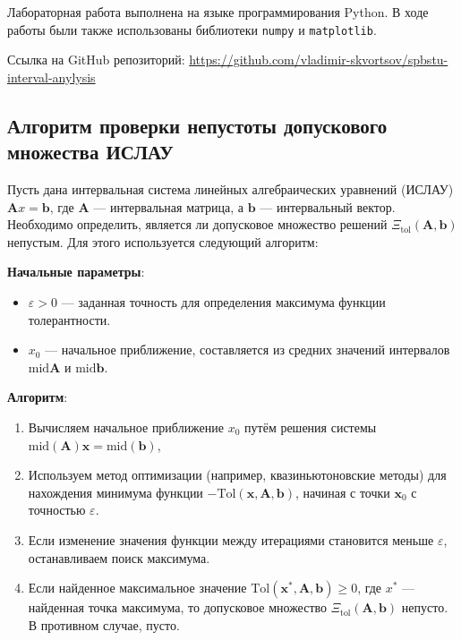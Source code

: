 \documentclass{article}
\begin{document}
  Лабораторная работа выполнена на языке программирования Python. В ходе
  работы были также использованы библиотеки \verb!numpy! и
  \verb!matplotlib!.

  Ссылка на GitHub репозиторий:
  \href{https://github.com/vladimir-skvortsov/spbstu-interval-anylysis}{https://github.com/vladimir-skvortsov/spbstu-interval-anylysis}

  \subsection{Алгоритм проверки непустоты допускового множества ИСЛАУ}

  Пусть дана интервальная система линейных алгебраических уравнений
  (ИСЛАУ) \( \mathbf{A}x = \mathbf{b} \), где \( \mathbf{A} \) ---
  интервальная матрица, а \( \mathbf{b} \) — интервальный вектор.
  Необходимо определить, является ли допусковое множество решений
  \( \Xi_{\text{tol}}(\mathbf{A}, \mathbf{b}) \) непустым. Для этого
  используется следующий алгоритм:

  \textbf{Начальные параметры}:
  \begin{itemize}
    \item \( \varepsilon > 0 \) --- заданная точность для определения
      максимума функции толерантности.
    \item \( x_0 \) --- начальное приближение, составляется из средних
      значений интервалов \( \text{mid} \mathbf{A} \) и
      \( \text{mid} \mathbf{b} \).
  \end{itemize}

  \textbf{Алгоритм}:
  \begin{enumerate}
    \item Вычисляем начальное приближение \( x_0 \) путём решения системы
      \( \text{mid}(\mathbf{A}) \mathbf{x} = \text{mid}(\mathbf{b}) \),
    \item Используем метод оптимизации (например, квазиньютоновские
      методы) для нахождения минимума функции
      \( -\text{Tol}(\mathbf{x}, \mathbf{A}, \mathbf{b}) \), начиная с точки
      \( \mathbf{x}_0 \) с точностью \( \varepsilon \).
    \item Если изменение значения функции между итерациями становится
      меньше \( \varepsilon \), останавливаем поиск максимума.
    \item Если найденное максимальное значение
      \( \text{Tol}(\mathbf{x}^*, \mathbf{A}, \mathbf{b}) \geqslant 0 \), где
      \( x^* \) --- найденная точка максимума, то допусковое множество
      \( \Xi_{\text{tol}}(\mathbf{A}, \mathbf{b}) \) непусто. В противном
      случае, пусто.
  \end{enumerate}
\end{document}
